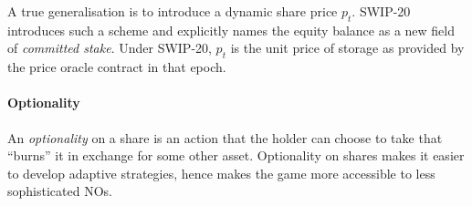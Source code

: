 A true generalisation is to introduce a dynamic share price $p_t$.
%
SWIP-20 introduces such a scheme and explicitly names the equity balance as a new field of \emph{committed stake}.
%
Under SWIP-20, $p_t$ is the unit price of storage as provided by the price oracle contract in that epoch.

\paragraph{Optionality}

An \emph{optionality} on a share is an action that the holder can choose to take that ``burns'' it in exchange for some other asset.
%
Optionality on shares makes it easier to develop adaptive strategies, hence makes the game more accessible to less sophisticated NOs.

